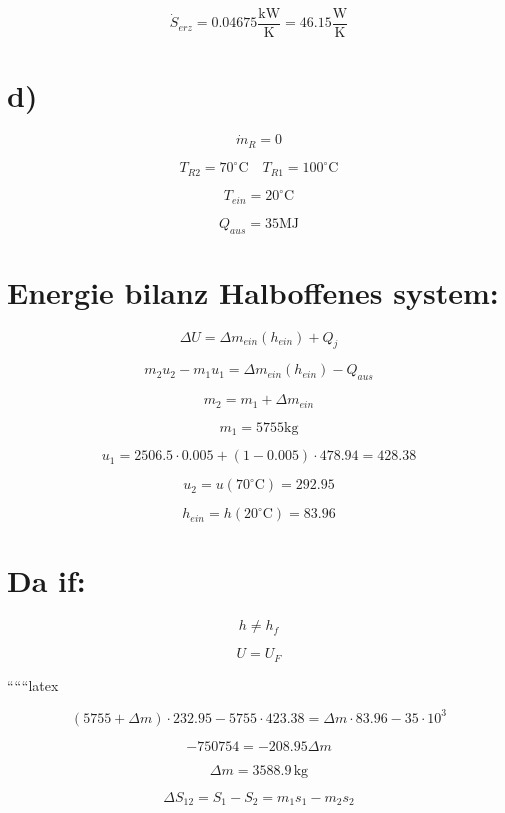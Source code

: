 \[
\dot{S}_{erz} = 0.04675 \frac{\text{kW}}{\text{K}} = 46.15 \frac{\text{W}}{\text{K}}
\]

\section*{d)}

\[
\dot{m}_R = 0
\]

\[
T_{R2} = 70^\circ \text{C} \quad T_{R1} = 100^\circ \text{C}
\]

\[
T_{ein} = 20^\circ \text{C}
\]

\[
Q_{aus} = 35 \text{MJ}
\]

\section*{Energie bilanz Halboffenes system:}

\[
\Delta U = \Delta m_{ein} (h_{ein}) + Q_j
\]

\[
m_2 u_2 - m_1 u_1 = \Delta m_{ein} (h_{ein}) - Q_{aus}
\]

\[
m_2 = m_1 + \Delta m_{ein}
\]

\[
m_1 = 5755 \text{kg}
\]

\[
u_1 = 2506.5 \cdot 0.005 + (1 - 0.005) \cdot 478.94 = 428.38
\]

\[
u_2 = u (70^\circ \text{C}) = 292.95
\]

\[
h_{ein} = h (20^\circ \text{C}) = 83.96
\]

\section*{Da if:}

\[
h \neq h_f
\]

\[
U = U_F
\]

``````latex

\begin{equation*}
(5755 + \Delta m) \cdot 232.95 - 5755 \cdot 423.38 = \Delta m \cdot 83.96 - 35 \cdot 10^3
\end{equation*}

\begin{equation*}
- 750754 = -208.95 \Delta m
\end{equation*}

\begin{equation*}
\Delta m = 3588.9 \, \text{kg}
\end{equation*}

\begin{equation*}
\Delta S_{12} = S_1 - S_2 = m_1 s_1 - m_2 s_2
\end{equation*}

